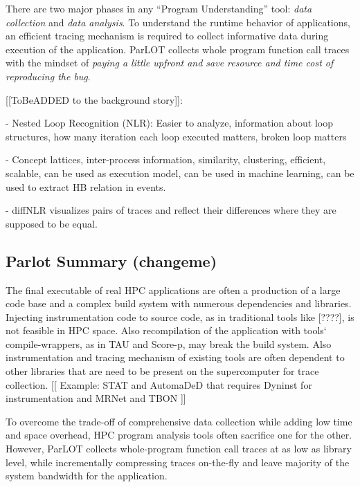 There are two major phases in any ``Program Understanding'' tool: \textit{data collection} and \textit{data analysis}.
%
To understand the runtime behavior of applications, an efficient tracing mechanism is required to collect informative data during execution of the application.
%
ParLOT collects whole program function call traces with the mindset of \textit{paying a little upfront and save resource and time cost of reproducing the bug}.

[[ToBeADDED to the background story]]:

- Nested Loop Recognition (NLR): Easier to analyze, information about loop structures, how many iteration each loop executed matters, broken loop matters

- Concept lattices, inter-process information, similarity, clustering, efficient, scalable, can be used as execution model, can be used in machine learning, can be used to extract HB relation in events.

- diffNLR visualizes pairs of traces and reflect their differences where they are supposed to be equal. 



\subsection{Parlot Summary (changeme)}
The final executable of real HPC applications are often a production of a large code base and a complex build system with numerous dependencies and libraries. Injecting instrumentation code to source code, as in traditional tools like [????], is not feasible in HPC space. Also recompilation of the application with tools` compile-wrappers, as in TAU\cite{tau} and Score-p\cite{scorep}, may break the build system. 
Also instrumentation and tracing mechanism of existing tools are often dependent to other libraries that are need to be present on the supercomputer for trace collection. [[ Example: STAT\cite{stat} and AutomaDeD\cite{automaded-laguna} that requires Dyninst\cite{dyninst} for instrumentation and MRNet\cite{mrnet} and TBON \cite{tbon}]]

To overcome the trade-off of comprehensive data collection while adding low time and space overhead, HPC program analysis tools often sacrifice one for the other. However, ParLOT collects whole-program function call traces at as low as library level, while incrementally compressing traces on-the-fly and leave majority of the system bandwidth for the application. 

